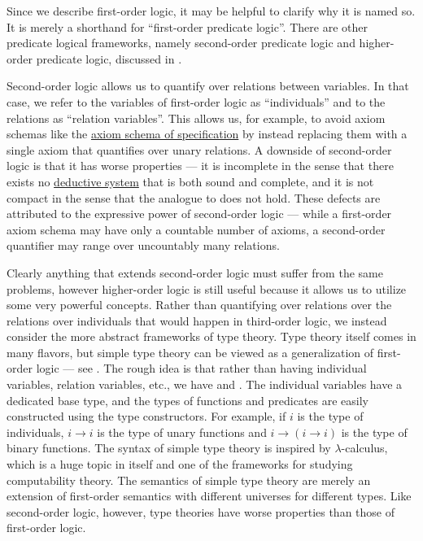 \begin{remark}\label{rem:higher_order_logic}
  Since we describe first-order logic, it may be helpful to clarify why it is named so. It is merely a shorthand for \enquote{first-order predicate logic}. There are other predicate logical frameworks, namely second-order predicate logic and higher-order predicate logic, discussed in \cite[sec. 3.6]{Hinman2005}.

  Second-order logic allows us to quantify over relations between variables. In that case, we refer to the variables of first-order logic as \enquote{individuals} and to the relations as \enquote{relation variables}. This allows us, for example, to avoid axiom schemas like the \hyperref[def:zfc/specification]{axiom schema of specification} by instead replacing them with a single axiom that quantifies over unary relations. A downside of second-order logic is that it has worse properties --- it is incomplete in the sense that there exists no \hyperref[def:deductive_system]{deductive system} that is both sound and complete, and it is not compact in the sense that the analogue to  does not hold. These defects are attributed to the expressive power of second-order logic --- while a first-order axiom schema may have only a countable number of axioms, a second-order quantifier may range over uncountably many relations.

  Clearly anything that extends second-order logic must suffer from the same problems, however higher-order logic is still useful because it allows us to utilize some very powerful concepts. Rather than quantifying over relations over the relations over individuals that would happen in third-order logic, we instead consider the more abstract frameworks of type theory. Type theory itself comes in many flavors, but simple type theory can be viewed as a generalization of first-order logic --- see \cite[thm. 2]{Farmer2008}. The rough idea is that rather than having individual variables, relation variables, etc., we have  and . The individual variables have a dedicated base type, and the types of functions and predicates are easily constructed using the type constructors. For example, if \( i \) is the type of individuals, \( i \rightarrow i \) is the type of unary functions and \( i \rightarrow (i \rightarrow i) \) is the type of binary functions. The syntax of simple type theory is inspired by \( \lambda \)-calculus, which is a huge topic in itself and one of the frameworks for studying computability theory. The semantics of simple type theory are merely an extension of first-order semantics with different universes for different types. Like second-order logic, however, type theories have worse properties than those of first-order logic.


\end{remark}
